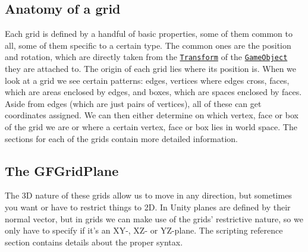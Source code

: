 \subsection*{Anatomy of a grid }

Each grid is defined by a handful of basic properties, some of them common to all, some of them specific to a certain type. The common ones are the position and rotation, which are directly taken from the \href{http://docs.unity3d.com/Documentation/ScriptReference/Transform.html}{\tt Transform} of the \href{http://docs.unity3d.com/Documentation/ScriptReference/GameObject.html}{\tt Game\+Object} they are attached to. The origin of each grid lies where its position is.  When we look at a grid we see certain patterns\+: edges, vertices where edges cross, faces, which are areas enclosed by edges, and boxes, which are spaces enclosed by faces. Aside from edges (which are just pairs of vertices), all of these can get coordinates assigned. We can then either determine on which vertex, face or box of the grid we are or where a certain vertex, face or box lies in world space. The sections for each of the grids contain more detailed information.

\subsection*{The G\+F\+Grid\+Plane }

The 3\+D nature of these grids allow us to move in any direction, but sometimes you want or have to restrict things to 2\+D. In Unity planes are defined by their normal vector, but in grids we can make use of the grids’ restrictive nature, so we only have to specify if it’s an X\+Y-\/, X\+Z-\/ or Y\+Z-\/plane. The scripting reference section contains details about the proper syntax. 